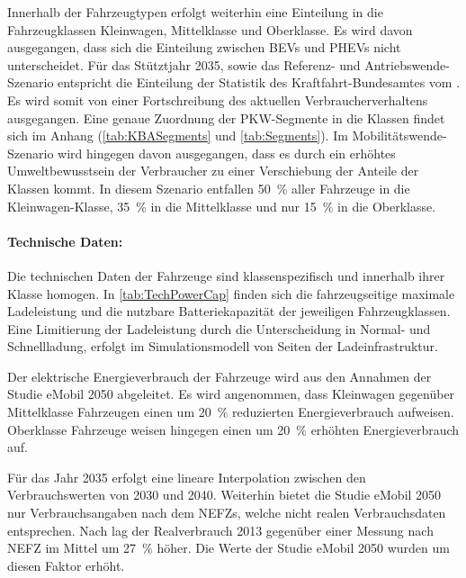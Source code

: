 Innerhalb der Fahrzeugtypen erfolgt weiterhin eine Einteilung in die Fahrzeugklassen Kleinwagen, Mittelklasse und Oberklasse.
Es wird davon ausgegangen, dass sich die Einteilung zwischen \glspl{BEV} und \glspl{PHEV} nicht unterscheidet.
Für das Stütztjahr \num{2035}, sowie das Referenz- und Antriebswende-Szenario entspricht die Einteilung der Statistik des Kraftfahrt-Bundesamtes \cite{KBASegments2020} vom .
Es wird somit von einer Fortschreibung des aktuellen Verbraucherverhaltens ausgegangen.
Eine genaue Zuordnung der \gls{PKW}-Segmente in die Klassen findet sich im Anhang (\autoref{tab:KBASegments} und \autoref{tab:Segments}).
Im Mobilitätswende-Szenario wird hingegen davon ausgegangen, dass es durch ein erhöhtes Umweltbewusstsein der Verbraucher zu einer Verschiebung der Anteile der Klassen kommt.
In diesem Szenario entfallen \SI{50}{\percent} aller Fahrzeuge in die Kleinwagen-Klasse, \SI{35}{\percent} in die Mittelklasse und nur \SI{15}{\percent} in die Oberklasse.

\paragraph{Technische Daten:}

Die technischen Daten der Fahrzeuge sind klassenspezifisch und innerhalb ihrer Klasse homogen.
In \autoref{tab:TechPowerCap} finden sich die fahrzeugseitige maximale Ladeleistung und die nutzbare Batteriekapazität der jeweiligen Fahrzeugklassen.
Eine Limitierung der Ladeleistung durch die Unterscheidung in Normal- und Schnellladung, erfolgt im Simulationsmodell von Seiten der Ladeinfrastruktur.



Der elektrische Energieverbrauch der Fahrzeuge wird aus den Annahmen der Studie \glqq eMobil \num{2050}\grqq{} \cite{Hacker2014} abgeleitet.
Es wird angenommen, dass Kleinwagen gegenüber Mittelklasse Fahrzeugen einen um \SI{20}{\percent} reduzierten Energieverbrauch aufweisen.
Oberklasse Fahrzeuge weisen hingegen einen um \SI{20}{\percent} erhöhten Energieverbrauch auf.\medskip

Für das Jahr \num{2035} erfolgt eine lineare Interpolation zwischen den Verbrauchswerten von \num{2030} und \num{2040}.
Weiterhin bietet die Studie \glqq eMobil \num{2050}\grqq{} nur Verbrauchsangaben nach dem \glspl{NEFZ}, welche nicht realen Verbrauchsdaten entsprechen.
Nach \cite{Heinfellner2015} lag der Realverbrauch \num{2013} gegenüber einer Messung nach \gls{NEFZ} im Mittel um \SI{27}{\percent} höher.
Die Werte der Studie \glqq eMobil \num{2050}\grqq{} wurden um diesen Faktor erhöht.

